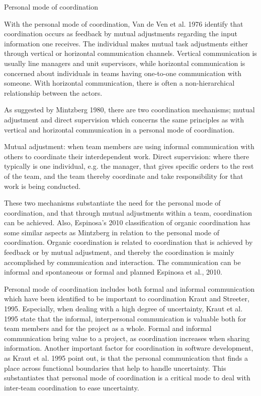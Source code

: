 Personal mode of coordination

With the personal mode of coordination, Van de Ven et al. 1976 identify that coordination occurs as feedback by mutual adjustments regarding the input information one receives. The individual makes mutual task adjustments either through vertical or horizontal communication channels. Vertical communication is usually line managers and unit supervisors, while horizontal communication is concerned about individuals in teams having one-to-one communication with someone. With horizontal communication, there is often a non-hierarchical relationship between the actors.

As suggested by Mintzberg 1980, there are two coordination mechanisms; mutual adjustment and direct supervision which concerns the same principles as with vertical and horizontal communication in a personal mode of coordination.

Mutual adjustment: when team members are using informal communication with others to coordinate their interdependent work.
Direct supervision: where there typically is one individual, e.g. the manager, that gives specific orders to the rest of the team, and the team thereby coordinate and take responsibility for that work is being conducted.

These two mechanisms substantiate the need for the personal mode of coordination, and that through mutual adjustments within a team, coordination can be achieved. Also, Espinosa’s 2010 classification of organic coordination has some similar aspects as Mintzberg in relation to the personal mode of coordination. Organic coordination is related to coordination that is achieved by feedback or by mutual adjustment, and thereby the coordination is mainly accomplished by communication and interaction. The communication can be informal and spontaneous or formal and planned Espinosa et al., 2010.

Personal mode of coordination includes both formal and informal communication which have been identified to be important to coordination Kraut and Streeter, 1995. Especially, when dealing with a high degree of uncertainty, Kraut et al. 1995 state that the informal, interpersonal communication is valuable both for team members and for the project as a whole. Formal and informal communication bring value to a project, as coordination increases when sharing information. Another important factor for coordination in software development, as Kraut et al. 1995 point out, is that the personal communication that finds a place across functional boundaries that help to handle uncertainty. This substantiates that personal mode of coordination is a critical mode to deal with inter-team coordination to ease uncertainty.

